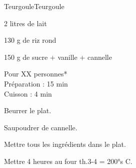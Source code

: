 \begin{recette}{Teurgoule}{Teurgoule}

\begin{ingredients}
2 litres de lait\par
130 g de riz rond\par
150 g de sucre + vanille + cannelle\par
\end{ingredients}

\begin{infos}
Pour XX personnes*	\\
Préparation : 15 min\\
Cuisson : 4 min\\
\end{infos}

\begin{etapes}
\item Beurrer le plat.
\item Saupoudrer de cannelle.
\item Mettre tous les ingrédients dans le plat.
\item Mettre 4 heures au four th.3-4 = 200°s C.
\end{etapes}

\end{recette}